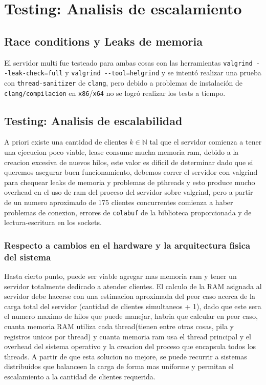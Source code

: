 \section{Testing: Analisis de escalamiento}
\subsection{Race conditions y Leaks de memoria}
El servidor multi fue testeado para ambas cosas con las herramientas \verb|valgrind --leak-check=full| y \verb|valgrind --tool=helgrind| y se intent\'o realizar una prueba con \verb|thread-sanitizer| de \verb|clang|, pero debido a problemas de instalaci\'on de \verb|clang/compilacion| en \verb|x86|/\verb|x64| no se logr\'o realizar los tests a tiempo.

\subsection{Testing: Analisis de escalabilidad}
A priori existe una cantidad de clientes $k \in \mathbb{N}$ tal que el servidor comienza a tener una ejecucion poco viable, lease consume mucha memoria ram, debido a la creacion excesiva de nuevos hilos, este valor es dificil de determinar dado que si queremos asegurar buen funcionamiento, debemos correr el servidor con valgrind para chequear leaks de memoria y problemas de pthreads y esto produce mucho overhead en el uso de ram del proceso del servidor sobre valgrind, pero a partir de un numero aproximado de 175 clientes concurrentes comienza a haber problemas de conexion, errores de \verb|colabuf| de la biblioteca proporcionada y de lectura-escritura en los sockets. 

\subsubsection{Respecto a cambios en el hardware y la arquitectura fisica del sistema}
Hasta cierto punto, puede ser viable agregar mas memoria ram y tener un servidor totalmente dedicado a atender clientes. El calculo de la RAM asignada al servidor debe hacerse con una estimacion aproximada del peor caso acerca de la carga total del servidor (cantidad de clientes simultaneos + 1), dado que este sera el numero maximo de hilos que puede manejar, habria que calcular en peor caso, cuanta memoria RAM utiliza cada thread(tienen entre otras cosas, pila y registros unicos por thread) y cuanta memoria ram usa el thread principal y el overhead del sistema operativo y la creacion del proceso que encapsula todos los threads.
A partir de que esta solucion no mejore, se puede recurrir a sistemas distribuidos que balanceen la carga de forma mas uniforme y permitan el escalamiento a la cantidad de clientes requerida.

